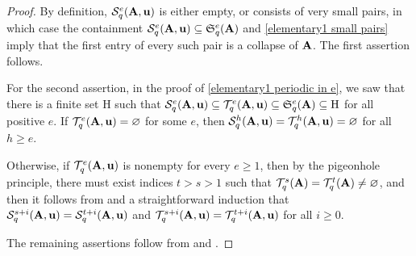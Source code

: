 \documentclass{amsart}
\begin{document}
\begin{proof}
By definition, $\mathcal{S}_{q}^e(\mathbf{A}, \mathbf{u})$ is either empty, or consists of very small pairs, in which case the containment $\mathcal{S}_{q}^e(\mathbf{A}, \mathbf{u}) \subseteq \mathfrak{S}_{q}^e(\mathbf{A})$ and    \ref{elementary1 small pairs} imply that the first entry of every such pair is a collapse of $\mathbf{A}$.   The first assertion follows.

For the second assertion, in the proof of \ref{elementary1 periodic in e}, we saw that there is a finite set $\mathrm{H}$ such that $\mathcal{S}_{q}^e(\mathbf{A}, \mathbf{u}) \subseteq \mathcal{T}_{q}^e(\mathbf{A}, \mathbf{u}) \subseteq \mathfrak{S}_{q}^e(\mathbf{A}) \subseteq \mathrm{H}$ for all positive $e$.  If $\mathcal{T}_{q}^e(\mathbf{A}, \mathbf{u}) = \varnothing$ for some $e$, then $\mathcal{S}_{q}^h(\mathbf{A}, \mathbf{u}) = \mathcal{T}_{q}^h(\mathbf{A}, \mathbf{u}) = \varnothing$ for all $h \geq e$.  

Otherwise, if $\mathcal{T}_{q}^e(\mathbf{A}, \mathbf{u})$ is nonempty for every $e \geq 1$, then by the pigeonhole principle, there must exist indices $t > s > 1$ such that $\mathcal{T}_{q}^s(\mathbf{A}) = \mathcal{T}_{q}^t(\mathbf{A}) \neq \varnothing$, and then it follows from  and a straightforward induction that $\mathcal{S}_{q}^{s+i}(\mathbf{A}, \mathbf{u}) = \mathcal{S}_{q}^{t+i}(\mathbf{A}, \mathbf{u})$ and  $\mathcal{T}_{q}^{s+i}(\mathbf{A}, \mathbf{u}) = \mathcal{T}_{q}^{t+i}(\mathbf{A}, \mathbf{u})$ for all $i \geq 0$.

The remaining assertions follow from  and .
\end{proof}
\end{document}
